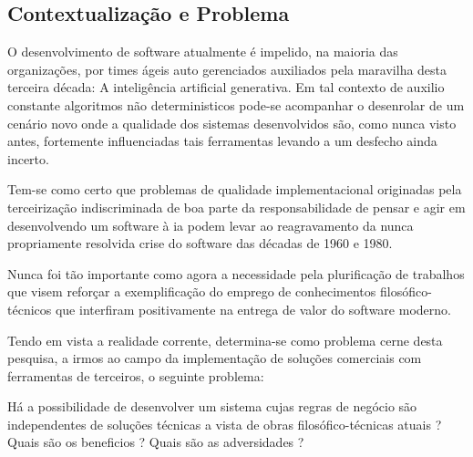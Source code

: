 

\subsection{\textbf{Contextualização e Problema}}
    \label{subsec:contextualizacao-problema}

    O desenvolvimento de software atualmente é impelido, na maioria das organizações,
    por times ágeis auto gerenciados auxiliados pela maravilha desta terceira década:
    A inteligência artificial generativa. Em tal contexto de auxilio constante algoritmos
    não deterministicos pode-se acompanhar o desenrolar de um cenário novo onde a
    qualidade dos sistemas desenvolvidos são, como nunca visto antes, fortemente
    influenciadas tais ferramentas levando a um desfecho ainda incerto.

    Tem-se como certo que problemas de qualidade implementacional originadas pela terceirização
    indiscriminada de boa parte da responsabilidade de pensar e agir em desenvolvendo um software
    à \ac{ia} podem levar ao reagravamento da nunca propriamente resolvida
    crise do software das décadas de 1960 e 1980.

    Nunca foi tão importante como agora a necessidade pela plurificação de trabalhos que
    visem reforçar a exemplificação do emprego de conhecimentos filosófico-técnicos que
    interfiram positivamente na entrega de valor do software moderno.

    Tendo em vista a realidade corrente, determina-se como problema cerne desta pesquisa,
    a irmos ao campo da implementação de soluções comerciais com ferramentas de terceiros,
    o seguinte problema:

    Há a possibilidade de desenvolver um sistema cujas regras de negócio são independentes
    de soluções técnicas a vista de obras filosófico-técnicas atuais ?
    Quais são os beneficios ?
    Quais são as adversidades ?


